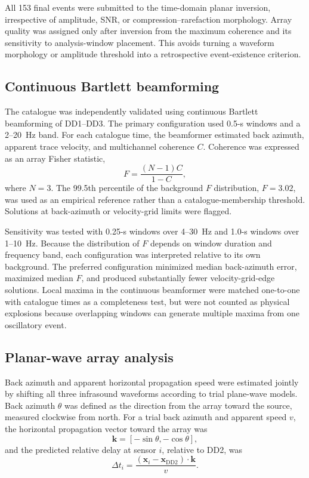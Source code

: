 \documentclass[]{seismica}
\begin{document}
All 153 final events were submitted to the time-domain planar inversion,
irrespective of amplitude, SNR, or compression--rarefaction morphology. Array
quality was assigned only after inversion from the maximum coherence and its
sensitivity to analysis-window placement. This avoids turning a waveform
morphology or amplitude threshold into a retrospective event-existence
criterion.

\subsection{Continuous Bartlett beamforming}

The catalogue was independently validated using continuous Bartlett
beamforming of DD1--DD3. The primary configuration used 0.5-s windows and a
2--20~Hz band. For each catalogue time, the beamformer estimated back azimuth,
apparent trace velocity, and multichannel coherence $C$. Coherence was
expressed as an array Fisher statistic,
\begin{equation}
  F=\frac{(N-1)C}{1-C},
  \label{eq:f_statistic}
\end{equation}
where $N=3$. The 99.5th percentile of the background $F$ distribution,
$F=3.02$, was used as an empirical reference rather than a catalogue-membership
threshold. Solutions at back-azimuth or velocity-grid limits were flagged.

Sensitivity was tested with 0.25-s windows over 4--30~Hz and 1.0-s windows
over 1--10~Hz. Because the distribution of $F$ depends on window duration and
frequency band, each configuration was interpreted relative to its own
background. The preferred configuration minimized median back-azimuth error,
maximized median $F$, and produced substantially fewer velocity-grid-edge
solutions. Local maxima in the continuous beamformer were matched one-to-one
with catalogue times as a completeness test, but were not counted as physical
explosions because overlapping windows can generate multiple maxima from one
oscillatory event.

\subsection{Planar-wave array analysis}

Back azimuth and apparent horizontal propagation speed were estimated jointly by shifting all three infrasound waveforms according to trial plane-wave models. Back azimuth $\theta$ was defined as the direction from the array toward the source, measured clockwise from north. For a trial back azimuth and apparent speed $v$, the horizontal propagation vector toward the array was
\begin{equation}
  \mathbf{k} = [-\sin\theta,-\cos\theta],
  \label{eq:propagation_vector}
\end{equation}
and the predicted relative delay at sensor $i$, relative to DD2, was
\begin{equation}
  \Delta t_i = \frac{(\mathbf{x}_i-\mathbf{x}_{\mathrm{DD2}})\cdot\mathbf{k}}{v}.
  \label{eq:plane_delay}
\end{equation}
\end{document}
